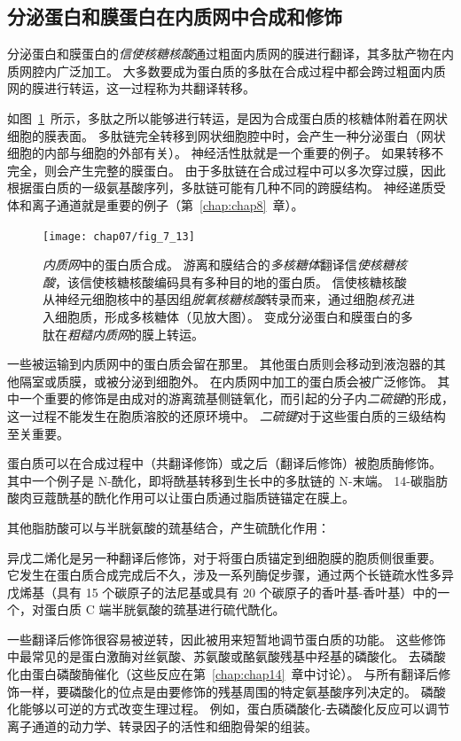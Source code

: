\subsection{分泌蛋白和膜蛋白在内质网中合成和修饰}

分泌蛋白和膜蛋白的\textit{信使核糖核酸}通过粗面内质网的膜进行翻译，其多肽产物在内质网腔内广泛加工。
大多数要成为蛋白质的多肽在合成过程中都会跨过粗面内质网的膜进行转运，这一过程称为共翻译转移。


如图~\ref{fig:7_13}~所示，多肽之所以能够进行转运，是因为合成蛋白质的核糖体附着在网状细胞的膜表面。
多肽链完全转移到网状细胞腔中时，会产生一种分泌蛋白（网状细胞的内部与细胞的外部有关）。
神经活性肽就是一个重要的例子。
如果转移不完全，则会产生完整的膜蛋白。
由于多肽链在合成过程中可以多次穿过膜，因此根据蛋白质的一级氨基酸序列，多肽链可能有几种不同的跨膜结构。
神经递质受体和离子通道就是重要的例子（第~\ref{chap:chap8}~章）。


\begin{figure}[htbp]
	\centering
	\texttt{[image: chap07/fig\_7\_13]}
	\caption{\textit{内质网}中的蛋白质合成。
		游离和膜结合的\textit{多核糖体}翻译信\textit{使核糖核酸}，该信使核糖核酸编码具有多种目的地的蛋白质。
		信使核糖核酸从神经元细胞核中的基因组\textit{脱氧核糖核酸}转录而来，通过细胞\textit{核孔}进入细胞质，形成多核糖体（见放大图）。
		变成分泌蛋白和膜蛋白的多肽在\textit{粗糙内质网}的膜上转运。}
	\label{fig:7_13}
\end{figure}


一些被运输到内质网中的蛋白质会留在那里。
其他蛋白质则会移动到液泡器的其他隔室或质膜，或被分泌到细胞外。
在内质网中加工的蛋白质会被广泛修饰。
其中一个重要的修饰是由成对的游离巯基侧链氧化，而引起的分子内\textit{二硫键}的形成，这一过程不能发生在胞质溶胶的还原环境中。
\textit{二硫键}对于这些蛋白质的三级结构至关重要。


蛋白质可以在合成过程中（共翻译修饰）或之后（翻译后修饰）被胞质酶修饰。
其中一个例子是 N-酰化，即将酰基转移到生长中的多肽链的 N-末端。
14-碳脂肪酸肉豆蔻酰基的酰化作用可以让蛋白质通过脂质链锚定在膜上。


其他脂肪酸可以与半胱氨酸的巯基结合，产生硫酰化作用：

异戊二烯化是另一种翻译后修饰，对于将蛋白质锚定到细胞膜的胞质侧很重要。
它发生在蛋白质合成完成后不久，涉及一系列酶促步骤，通过两个长链疏水性多异戊烯基（具有 15 个碳原子的法尼基或具有 20 个碳原子的香叶基-香叶基）中的一个，对蛋白质 C 端半胱氨酸的巯基进行硫代酰化。


一些翻译后修饰很容易被逆转，因此被用来短暂地调节蛋白质的功能。
这些修饰中最常见的是蛋白激酶对丝氨酸、苏氨酸或酪氨酸残基中羟基的磷酸化。
去磷酸化由蛋白磷酸酶催化（这些反应在第~\ref{chap:chap14}~章中讨论）。
与所有翻译后修饰一样，要磷酸化的位点是由要修饰的残基周围的特定氨基酸序列决定的。
磷酸化能够以可逆的方式改变生理过程。
例如，蛋白质磷酸化-去磷酸化反应可以调节离子通道的动力学、转录因子的活性和细胞骨架的组装。


